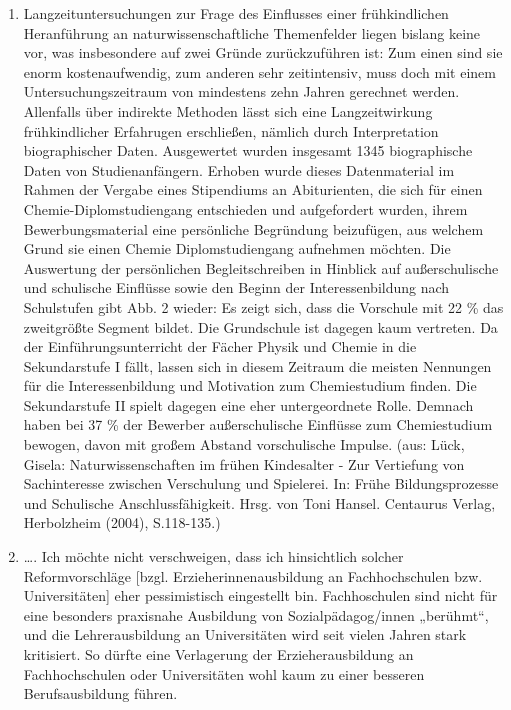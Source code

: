 \documentclass[]{book}
\theoremstyle{definition}
\theoremstyle{definition}
\theoremstyle{definition}
\theoremstyle{remark}
\begin{document}
\begin{enumerate}
\def\labelenumi{\alph{enumi})}
\item
  Langzeituntersuchungen zur Frage des Einflusses einer frühkindlichen
  Heranführung an naturwissenschaftliche Themenfelder liegen bislang
  keine vor, was insbesondere auf zwei Gründe zurückzuführen ist: Zum
  einen sind sie enorm kostenaufwendig, zum anderen sehr zeitintensiv,
  muss doch mit einem Untersuchungszeitraum von mindestens zehn Jahren
  gerechnet werden. Allenfalls über indirekte Methoden lässt sich eine
  Langzeitwirkung frühkindlicher Erfahrugen erschließen, nämlich durch
  Interpretation biographischer Daten. Ausgewertet wurden insgesamt 1345
  biographische Daten von Studienanfängern. Erhoben wurde dieses
  Datenmaterial im Rahmen der Vergabe eines Stipendiums an Abiturienten,
  die sich für einen Chemie-Diplomstudiengang entschieden und
  aufgefordert wurden, ihrem Bewerbungsmaterial eine persönliche
  Begründung beizufügen, aus welchem Grund sie einen Chemie
  Diplomstudiengang aufnehmen möchten. Die Auswertung der persönlichen
  Begleitschreiben in Hinblick auf außerschulische und schulische
  Einflüsse sowie den Beginn der Interessenbildung nach Schulstufen gibt
  Abb. 2 wieder: Es zeigt sich, dass die Vorschule mit 22 \% das
  zweitgrößte Segment bildet. Die Grundschule ist dagegen kaum
  vertreten. Da der Einführungsunterricht der Fächer Physik und Chemie
  in die Sekundarstufe I fällt, lassen sich in diesem Zeitraum die
  meisten Nennungen für die Interessenbildung und Motivation zum
  Chemiestudium finden. Die Sekundarstufe II spielt dagegen eine eher
  untergeordnete Rolle. Demnach haben bei 37 \% der Bewerber
  außerschulische Einflüsse zum Chemiestudium bewogen, davon mit großem
  Abstand vorschulische Impulse. (aus: Lück, Gisela: Naturwissenschaften
  im frühen Kindesalter - Zur Vertiefung von Sachinteresse zwischen
  Verschulung und Spielerei. In: Frühe Bildungsprozesse und Schulische
  Anschlussfähigkeit. Hrsg. von Toni Hansel. Centaurus Verlag,
  Herbolzheim (2004), S.118-135.)
\item
  \ldots{}. Ich möchte nicht verschweigen, dass ich hinsichtlich solcher
  Reformvorschläge {[}bzgl. Erzieherinnenausbildung an Fachhochschulen
  bzw. Universitäten{]} eher pessimistisch eingestellt bin.
  Fachhoschulen sind nicht für eine besonders praxisnahe Ausbildung von
  Sozialpädagog/innen „berühmt``, und die Lehrerausbildung an
  Universitäten wird seit vielen Jahren stark kritisiert. So dürfte eine
  Verlagerung der Erzieherausbildung an Fachhochschulen oder
  Universitäten wohl kaum zu einer besseren Berufsausbildung führen.

\end{enumerate}
\end{document}
